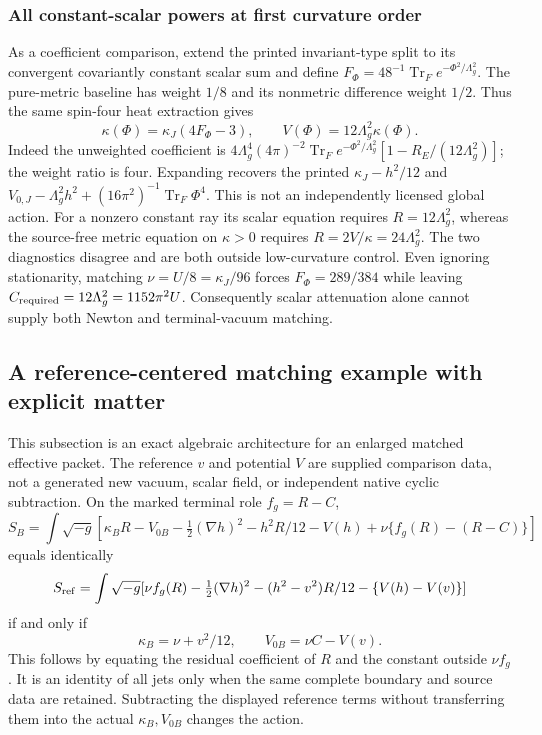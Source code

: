 \documentclass[11pt,a4paper]{article}
\begin{document}
\subsubsection{All constant-scalar powers at first curvature order}
As a coefficient comparison, extend the printed invariant-type split
to its convergent covariantly constant scalar sum and define
$F_\Phi=48^{-1}\operatorname{Tr}_F e^{-\Phi^2/\Lambda_g^2}$.
The pure-metric baseline has weight $1/8$ and its nonmetric difference
weight $1/2$.  Thus the same spin-four heat extraction gives
\[
 \kappa(\Phi)=\kappa_J(4F_\Phi-3),\qquad
 V(\Phi)=12\Lambda_g^2\kappa(\Phi).
\]
Indeed the unweighted coefficient is
$4\Lambda_g^4(4\pi)^{-2}\operatorname{Tr}_F
e^{-\Phi^2/\Lambda_g^2}[1-R_E/(12\Lambda_g^2)]$;
the weight ratio is four.  Expanding recovers the printed
$\kappa_J-h^2/12$ and
$V_{0,J}-\Lambda_g^2h^2+(16\pi^2)^{-1}\operatorname{Tr}_F\Phi^4$.
This is not an independently licensed global action.
For a nonzero constant ray its scalar equation requires
$R=12\Lambda_g^2$, whereas the source-free metric equation on
$\kappa>0$ requires $R=2V/\kappa=24\Lambda_g^2$.
The two diagnostics disagree and are both outside low-curvature control.
Even ignoring stationarity, matching $\nu=U/8=\kappa_J/96$ forces
$F_\Phi=289/384$ while leaving
$C_{\rm required}=12\Lambda_g^2=1152\pi^2U$.
Consequently scalar attenuation alone cannot supply both Newton and
terminal-vacuum matching.

\subsection{A reference-centered matching example with explicit matter}
\label{p3f:app:v2216-reference-centered-matching}
This subsection is an exact algebraic architecture for an enlarged matched
effective packet.  The reference $v$ and potential $V$ are supplied
comparison data, not a generated new vacuum, scalar field, or independent
native cyclic subtraction.  On the marked terminal role $f_g=R-C$,
\[
 S_B=\int\sqrt{-g}[\kappa_BR-V_{0B}
 -\tfrac12(\nabla h)^2-h^2R/12-V(h)
 +\nu\{f_g(R)-(R-C)\}]
\]
equals identically
\[
 S_{\rm ref}=\int\sqrt{-g}[\nu f_g(R)-\tfrac12(\nabla h)^2
 -(h^2-v^2)R/12-\{V(h)-V(v)\}]
\]
if and only if
\begin{equation}
 \kappa_B=\nu+v^2/12,\qquad V_{0B}=\nu C-V(v).
 \label{p3f:eq:v2216-reference-matching}
\end{equation}
This follows by equating the residual coefficient of $R$ and the
constant outside $\nu f_g$.  It is an identity of all jets only when
the same complete boundary and source data are retained.  Subtracting
the displayed reference terms without transferring them into the
actual $\kappa_B,V_{0B}$ changes the action.
\end{document}
